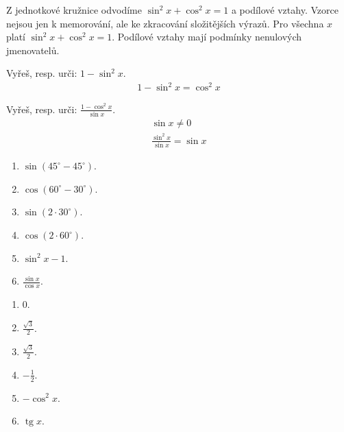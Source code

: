 \documentclass[11pt,a4paper]{article}
\begin{document}
Z jednotkové kružnice odvodíme $\sin^2x+\cos^2x=1$ a podílové vztahy. Vzorce nejsou jen k memorování, ale ke zkracování složitějších výrazů.
Pro všechna $x$ platí $\sin^2x+\cos^2x=1$. Podílové vztahy mají podmínky nenulových jmenovatelů.
\begin{prikladReseniBox}[title={Příklad 1}]
Vyřeš, resp. urči: $1-\sin^2x$.
\tcblower
\[\begin{aligned}1-\sin^2x=\cos^2x\end{aligned}\]
\end{prikladReseniBox}
\begin{prikladReseniBox}[title={Příklad 2}]
Vyřeš, resp. urči: $\frac{1-\cos^2x}{\sin x}$.
\tcblower
\[\begin{aligned}\sin x\ne0 \\ \frac{\sin^2x}{\sin x}=\sin x\end{aligned}\]
\end{prikladReseniBox}
\begin{zadaniReseniBox}[title={Samostatná práce 1}]
\begin{enumerate}[label=\alph*)]
\item $\sin(45^\circ-45^\circ)$.
\item $\cos(60^\circ-30^\circ)$.
\item $\sin(2\cdot30^\circ)$.
\item $\cos(2\cdot60^\circ)$.
\item $\sin^2x-1$.
\item $\frac{\sin x}{\cos x}$.
\end{enumerate}
\tcblower
\begin{enumerate}[label=\alph*)]
\item $0$.
\item $\frac{\sqrt3}{2}$.
\item $\frac{\sqrt3}{2}$.
\item $-\frac{1}{2}$.
\item $-\cos^2x$.
\item $\operatorname{tg}x$.
\end{enumerate}
\end{zadaniReseniBox}
\end{document}
